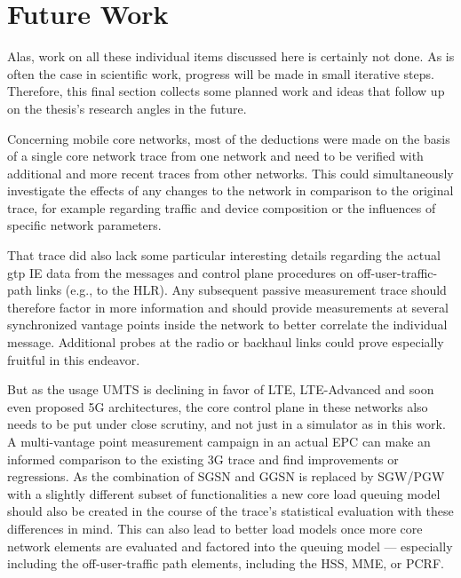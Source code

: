 \section{Future Work}

Alas, work on all these individual items discussed here is certainly not done. As is often the case in scientific work, progress will be made in small iterative steps. Therefore, this final section collects some planned work and ideas that follow up on the thesis's research angles in the future.

Concerning mobile core networks, most of the deductions were made on the basis of a single core network trace from one network and need to be verified with additional and more recent traces from other networks. This could simultaneously investigate the effects of any changes to the network in comparison to the original trace, for example regarding traffic and device composition or the influences of specific network parameters.

That trace did also lack some particular interesting details regarding the actual \gls{gtp} \gls{IE} data from the messages and control plane procedures on off-user-traffic-path links (e.g., to the \gls{HLR}). Any subsequent passive measurement trace should therefore factor in more information and should provide measurements at several synchronized vantage points inside the network to better correlate the individual message. Additional probes at the radio or backhaul links could prove especially fruitful in this endeavor. 

But as the usage \gls{UMTS} is declining in favor of \gls{LTE}, \gls{LTE}-Advanced and soon even proposed 5G architectures, the core control plane in these networks also needs to be put under close scrutiny, and not just in a simulator as in this work. A multi-vantage point measurement campaign in an actual \gls{EPC} can make an informed comparison to the existing \gls{3G} trace and find improvements or regressions. As the combination of \gls{SGSN} and \gls{GGSN} is replaced by \gls{SGW}/\gls{PGW} with a slightly different subset of functionalities a new core load queuing model should also be created in the course of the trace's statistical evaluation with these differences in mind. This can also lead to better load models once more core network elements are evaluated and factored into the queuing model --- especially including the off-user-traffic path elements, including the \gls{HSS}, \gls{MME}, or \gls{PCRF}.

